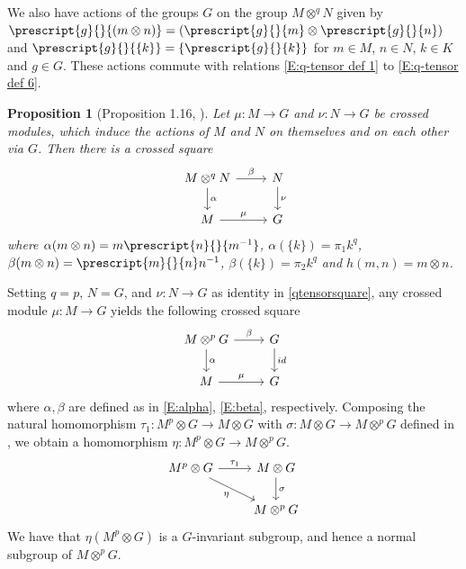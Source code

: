 \documentclass[12pt]{elsarticle}
\newtheorem*{main corollary*}{Main Corollary}
\newtheorem{prop}[theorem]{Proposition}
\theoremstyle{definition}
\newcommand{\tens}{
	\otimes^q}
\newcommand{\ptens}{
	\otimes^p}
\begin{document}
We also have actions of the groups $G$ on the group $M \tens N$ given by $\prescript{g}{}{(m \otimes n)}=(\prescript{g}{}{m} \otimes \prescript{g}{}{n})$ and $\prescript{g}{}{\{k\}}=\{\prescript{g}{}{k}\}$ for $m \in M$, $n \in N$, $k \in K$ and $g \in G$. These actions commute with relations \eqref{E:q-tensor def 1} to \eqref{E:q-tensor def 6}. 
\begin{prop} [Proposition 1.16, \cite{CR92}]\label{qtensor is crossed square}
     Let $\mu:M\to G$ and $\nu:N\to G$ be crossed modules, which induce the actions  of $M$ and $N$ on themselves and on each other via $G$. Then there is a crossed square 
\begin{equation}
    \begin{tikzcd} 
	M \tens N \arrow[r,"\beta"]\arrow[d,"\alpha"] & N\arrow[d,"\nu"] 
	\\ M \arrow[r, "\mu"]& G
    \end{tikzcd}\label{qtensorsquare}
\end{equation}
where $\alpha(m\otimes n)=m \prescript{n}{}{m^{-1}}$, $\alpha(\{k\})= \pi_1k^q$, $\beta(m\otimes n)= \prescript{m}{}{n}n^{-1}$, ${\beta(\{k\})=\pi_2k^q}$ and $h(m,n)=m\otimes n$.    
\end{prop}

 Setting $q=p$, $N=G$, and $\nu:N\to G $ as identity in \eqref{qtensorsquare}, any crossed module $\mu : M \to G$ yields the following crossed square 
\begin{equation}
	\begin{tikzcd} \label{Gqtensorcrossedsquare}
		M \otimes^p G \arrow[r,"\beta"]\arrow[d,"\alpha"] & G\arrow[d,"id"] 
		\\ M \arrow[r, "\mu"]& G
	\end{tikzcd}
\end{equation}where $\alpha,\beta$ are defined as in \eqref{E:alpha}, \eqref{E:beta}, respectively. Composing the natural homomorphism $\tau_1 : M^p \otimes G \to M\otimes G$ with $\sigma: M \otimes G \to M \ptens G$ defined in \cite[Proposition 1.6]{CR92}, we obtain a homomorphism $\eta: M^p \otimes G \to M \otimes^p G$. 
\begin{equation}
    \begin{tikzcd}
        M^{p}\otimes G\arrow[r, "\tau_1"]\arrow[dr,swap, "\eta"]&M\otimes G\arrow[d,"\sigma"]\\
        &M\otimes^p G
    \end{tikzcd}
\end{equation}We have that $\eta (M^p \otimes G)$ is a $G$-invariant subgroup, and hence a normal subgroup of $M \ptens G$.
\end{document}
